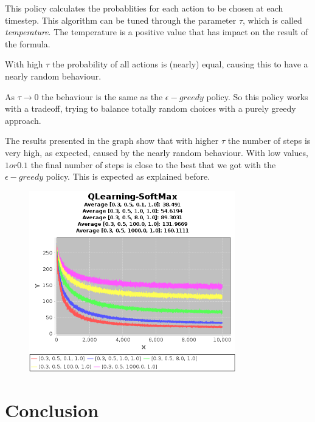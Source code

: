 \documentclass{article}
\begin{document}
This policy calculates the probablities for each action to be chosen at each
timestep. This algorithm can be tuned through the parameter $\tau$, which is
called \emph{temperature}.
The temperature is a positive value that has impact on the result of the
formula.

With high $\tau$ the probability of all actions is (nearly) equal, causing
this to have a nearly random behaviour.

As $\tau \rightarrow 0$ the behaviour is the same as the $\epsilon-greedy$
policy.
So this policy works with a tradeoff, trying to balance totally random choices with a purely greedy approach.

The results presented in the graph show that with higher $\tau$ the number of
steps is very high, as expected, caused by the nearly random behaviour. With low
values, $1 or 0.1$ the final number of steps is close to the best that we got
with the $\epsilon-greedy$ policy. This is expected as explained before.

\begin{figure}[htbp]
\centering
\includegraphics[width=0.8\textwidth]{res/alpha_03_gamma_05_temp_01_to_1000_IV_1.png}
\end{figure}

\section{Conclusion}
\end{document}

